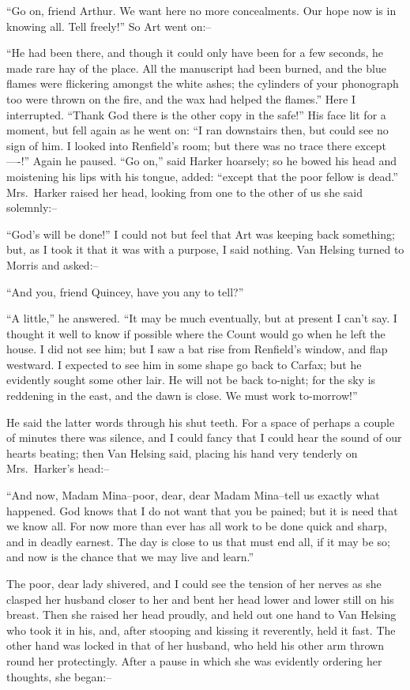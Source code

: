 \documentclass[12pt,openright]{book}
\begin{document}
“Go on, friend Arthur. We want here no more concealments. Our hope now is in knowing all. Tell freely!” So Art went on:–

“He had been there, and though it could only have been for a few seconds, he made rare hay of the place. All the manuscript had been burned, and the blue flames were flickering amongst the white ashes; the cylinders of your phonograph too were thrown on the fire, and the wax had helped the flames.” Here I interrupted. “Thank God there is the other copy in the safe!” His face lit for a moment, but fell again as he went on: “I ran downstairs then, but could see no sign of him. I looked into Renfield’s room; but there was no trace there except—-!” Again he paused. “Go on,” said Harker hoarsely; so he bowed his head and moistening his lips with his tongue, added: “except that the poor fellow is dead.” Mrs. Harker raised her head, looking from one to the other of us she said solemnly:–

“God’s will be done!” I could not but feel that Art was keeping back something; but, as I took it that it was with a purpose, I said nothing. Van Helsing turned to Morris and asked:–

“And you, friend Quincey, have you any to tell?”

“A little,” he answered. “It may be much eventually, but at present I can’t say. I thought it well to know if possible where the Count would go when he left the house. I did not see him; but I saw a bat rise from Renfield’s window, and flap westward. I expected to see him in some shape go back to Carfax; but he evidently sought some other lair. He will not be back to-night; for the sky is reddening in the east, and the dawn is close. We must work to-morrow!”

He said the latter words through his shut teeth. For a space of perhaps a couple of minutes there was silence, and I could fancy that I could hear the sound of our hearts beating; then Van Helsing said, placing his hand very tenderly on Mrs. Harker’s head:–

“And now, Madam Mina–poor, dear, dear Madam Mina–tell us exactly what happened. God knows that I do not want that you be pained; but it is need that we know all. For now more than ever has all work to be done quick and sharp, and in deadly earnest. The day is close to us that must end all, if it may be so; and now is the chance that we may live and learn.”

The poor, dear lady shivered, and I could see the tension of her nerves as she clasped her husband closer to her and bent her head lower and lower still on his breast. Then she raised her head proudly, and held out one hand to Van Helsing who took it in his, and, after stooping and kissing it reverently, held it fast. The other hand was locked in that of her husband, who held his other arm thrown round her protectingly. After a pause in which she was evidently ordering her thoughts, she began:–
\end{document}
